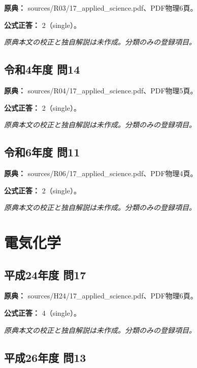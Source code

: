 \noindent\textbf{原典：} sources/R03/17\_applied\_science.pdf、PDF物理6頁。

\textbf{公式正答：} 2（single）。

\par\textit{原典本文の校正と独自解説は未作成。分類のみの登録項目。}

\subsection{令和4年度 問14}
\label{q:r04-reg-applied-14}

\noindent\textbf{原典：} sources/R04/17\_applied\_science.pdf、PDF物理5頁。

\textbf{公式正答：} 2（single）。

\par\textit{原典本文の校正と独自解説は未作成。分類のみの登録項目。}

\subsection{令和6年度 問11}
\label{q:r06-reg-applied-11}

\noindent\textbf{原典：} sources/R06/17\_applied\_science.pdf、PDF物理4頁。

\textbf{公式正答：} 2（single）。

\par\textit{原典本文の校正と独自解説は未作成。分類のみの登録項目。}

\section{電気化学}

\subsection{平成24年度 問17}
\label{q:h24-reg-applied-17}

\noindent\textbf{原典：} sources/H24/17\_applied\_science.pdf、PDF物理6頁。

\textbf{公式正答：} 4（single）。

\par\textit{原典本文の校正と独自解説は未作成。分類のみの登録項目。}

\subsection{平成26年度 問13}
\label{q:h26-reg-applied-13}

